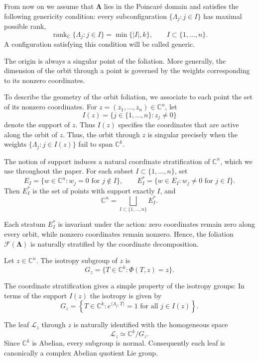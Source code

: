 \documentclass[11pt]{amsart}
\theoremstyle{definition}
\theoremstyle{remark}
\newcommand{\C}{\mathbb{C}}
\newcommand{\Lam}{\pmb{\Lambda}}
\DeclareMathOperator{\rank}{rank}
\newcommand{\leaf}[1]{\mathcal{L}_{#1}}
\newcommand{\strat}[1]{E_{#1}}
\newcommand{\stratSS}[1]{E_{#1}^*}
\newcommand{\stratS}[1]{\stratSS{#1}}
\begin{document}
\medskip
From now on we assume that $\Lam$ lies in the Poincaré domain and
satisfies the following genericity condition: every subconfiguration
$\{\Lambda_j:j\in I\}$ has maximal possible rank,
\[
	\rank_{\C}\{\Lambda_j:j\in I\}=\min\{|I|,k\},
	\qquad I\subset\{1,\dots,n\}.
\]
A configuration satisfying this condition will be called generic.

The origin is always a singular point of the foliation.
More generally, the dimension of the orbit through a point is governed by the weights corresponding to its nonzero coordinates.

To describe the geometry of the orbit foliation, we associate to each point the set of its nonzero coordinates.
For $z=(z_1,\dots,z_n)\in\C^n$, let
\[
	I(z)=\{j\in\{1,\dots,n\}: z_j\neq 0\}
\]
denote the support of $z$.
Thus $I(z)$ specifies the coordinates that are active along the orbit of $z$.
Thus, the orbit through $z$ is singular precisely when the weights $\{\Lambda_j:j\in I(z)\}$ fail to span $\C^k$.

The notion of support induces a natural coordinate stratification of $\C^n$, which we use throughout the paper.
For each subset $I\subset\{1,\dots,n\}$, set
\[
	\strat{I}=\{w\in\C^n:w_j=0\text{ for }j\notin I\}, \qquad \stratSS{I}=\{w\in \strat{I}:w_j\neq0\text{ for }j\in I\}.
\]
Then
$\stratSS{I}$
is the set of points with support exactly $I$, and
\begin{equation}\label{eq:stratification}
	\C^n=\bigsqcup_{I\subset\{1,\dots,n\}}\stratSS{I}.
\end{equation}

Each stratum $\stratS{I}$ is invariant under the action: zero coordinates remain zero along every orbit, while nonzero coordinates remain nonzero.
Hence, the foliation $\mathcal F(\Lam)$ is naturally stratified by the coordinate decomposition.

Let $z\in\C^n$.
The isotropy subgroup of $z$ is
\[
	G_z=\{T\in\C^k:\Phi(T,z)=z\}.
\]

The coordinate stratification gives a simple property of the isotropy groups: In terms of the support $I(z)$ the isotropy is given by
\[
	G_z= \left\{ T\in\C^k: e^{\langle\Lambda_j,T\rangle}=1 \text{ for all }j\in I(z) \right\}.
\]

The leaf $\leaf{z}$ through $z$ is naturally identified with the homogeneous space
\[
	\leaf{z}\simeq \C^k \big/ G_z.
\]
Since $\C^k$ is Abelian, every subgroup is normal.
Consequently each leaf is canonically a complex Abelian quotient Lie group.
\end{document}
